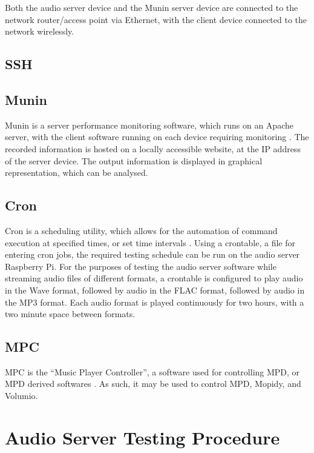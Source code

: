 \documentclass[11pt,a4paper]{scrreprt}
\begin{document}
Both the audio server device and the Munin server device are connected
to the network router/access point via Ethernet, with the client device
connected to the network wirelessly.

\subsection{SSH}\label{ssh}

\subsection{Munin}\label{munin}

Munin is a server performance monitoring software, which runs on an
Apache server, with the client software running on each device requiring
monitoring \cite{MuninMonitoring}. The recorded information is hosted on
a locally accessible website, at the IP address of the server device.
The output information is displayed in graphical representation, which
can be analysed.

\subsection{Cron}\label{cron}

Cron is a scheduling utility, which allows for the automation of command
execution at specified times, or set time intervals \cite{crontab}.
Using a crontable, a file for entering cron jobs, the required testing
schedule can be run on the audio server Raspberry Pi. For the purposes
of testing the audio server software while streaming audio files of
different formats, a crontable is configured to play audio in the Wave
format, followed by audio in the FLAC format, followed by audio in the
MP3 format. Each audio format is played continuously for two hours, with
a two minute space between formats.

\subsection{MPC}\label{mpc}

MPC is the ``Music Player Controller'', a software used for controlling
MPD, or MPD derived softwares \cite{mpc}. As such, it may be used to
control MPD, Mopidy, and Volumio.

\section{Audio Server Testing
Procedure}\label{audio-server-testing-procedure}
\end{document}
